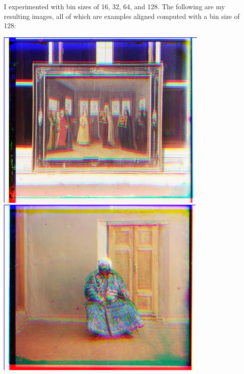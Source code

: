 \documentclass[12pt]{article}
\begin{document}
I experimented with bin sizes of 16, 32, 64, and 128. The following are my resulting images, all of which are examples aligned computed with a bin size of 128:

\begin{center}
\includegraphics[scale=0.6]{processed/processed-128-00149v.jpg}~
\includegraphics[scale=0.6]{processed/processed-128-00153v.jpg}
\end{center}
\end{document}
